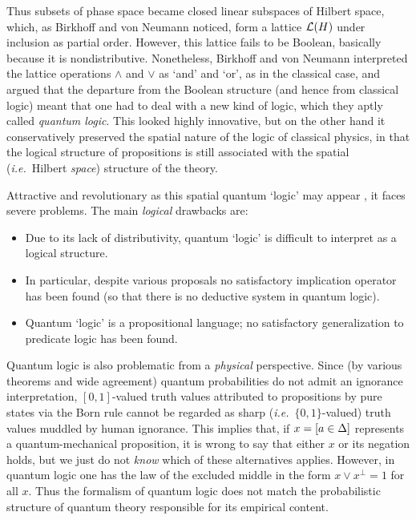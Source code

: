 \documentclass[11pt]{article}
\newcommand{\ie}{\textit{i.e.}}
\begin{document}
Thus subsets of phase space became closed linear subspaces of Hilbert space,
 which, as Birkhoff and von Neumann \cite{birkhoffvonneumann36}
noticed,  form a  lattice ${\mathcal L}(H)$
under inclusion as partial order. However, this lattice fails to be Boolean, basically because it is nondistributive.
Nonetheless, Birkhoff and von Neumann interpreted the lattice
operations $\wedge$ and $\vee$  as `and' and `or', as in the
classical case, and argued that the departure from the Boolean
structure (and hence from classical logic) meant that one had to deal
with a new kind of logic, which they aptly called {\it quantum
logic}. This looked highly innovative, but on the other hand it
conservatively preserved the spatial nature of the logic of classical
physics, in that the logical structure of propositions is still
associated with the spatial (\ie\ Hilbert {\it space}) structure of the
theory.

Attractive and revolutionary as this spatial quantum `logic' may appear
\cite{Varadarajan,kalmbach1,kalmbach2,redei}, it
faces severe problems. The main {\it logical} drawbacks are:
\begin{itemize}
\item Due to its lack of distributivity, quantum
`logic' is difficult to interpret as a logical structure.
\item In particular, despite various proposals no satisfactory implication operator has been found (so that there is no deductive system in quantum logic).
\item Quantum `logic' is a propositional language;
no satisfactory generalization to  predicate logic has been found.
\end{itemize}

Quantum logic is also problematic from
a {\it physical} perspective. Since (by various
theorems \cite{Bub} and wide agreement) quantum probabilities do not
admit an ignorance interpretation,  $[0,1]$-valued truth values
attributed to propositions by pure states via the Born rule cannot be
regarded as sharp (\ie\ $\{0,1\}$-valued) truth values muddled by human
ignorance. This implies that, if $x=[a\in\Delta]$ represents  a
quantum-mechanical proposition, it is wrong to say that either $x$ or
its negation holds, but we just do not {\it know} which of these
alternatives applies. However, in quantum logic one has
the law of the excluded middle in the form $x\vee x^{\perp}=1$
for all $x$.
Thus the formalism of quantum logic does not match the probabilistic
structure of quantum theory responsible for its empirical
content.
\end{document}
